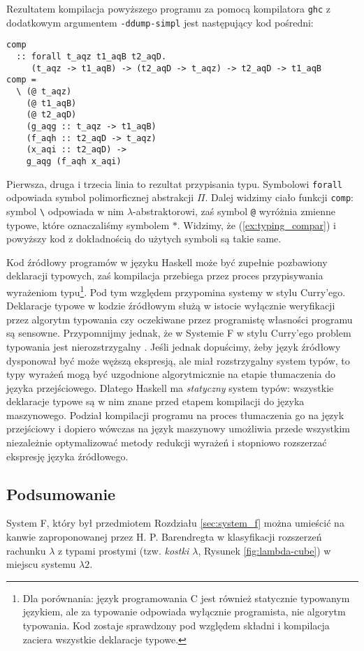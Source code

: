 Rezultatem kompilacja powyższego programu za pomocą kompilatora \texttt{ghc} z dodatkowym argumentem \texttt{-ddump-simpl} jest następujący kod pośredni:

\begin{verbatim}
comp
  :: forall t_aqz t1_aqB t2_aqD.
     (t_aqz -> t1_aqB) -> (t2_aqD -> t_aqz) -> t2_aqD -> t1_aqB
comp =
  \ (@ t_aqz)
    (@ t1_aqB)
    (@ t2_aqD)
    (g_aqg :: t_aqz -> t1_aqB)
    (f_aqh :: t2_aqD -> t_aqz)
    (x_aqi :: t2_aqD) ->
    g_aqg (f_aqh x_aqi)
\end{verbatim}

Pierwsza, druga i trzecia linia to rezultat przypisania typu. Symbolowi \texttt{forall} odpowiada symbol polimorficznej abstrakcji \(\Pi\). Dalej widzimy ciało funkcji \texttt{comp}: symbol \texttt{\textbackslash} odpowiada w nim \(\lambda\)-abstraktorowi, zaś symbol \texttt{@} wyróżnia zmienne typowe, które oznaczaliśmy symbolem \(\ast\). Widzimy, że (\ref{ex:typing_compar}) i powyższy kod z dokładnością do użytych symboli są takie same.

Kod źródłowy programów w języku Haskell może być zupełnie pozbawiony deklaracji typowych, zaś kompilacja przebiega przez proces przypisywania wyrażeniom typu\footnote{Dla porównania: język programowania C jest również statycznie typowanym językiem, ale za typowanie odpowiada wyłącznie programista, nie algorytm typowania. Kod zostaje sprawdzony pod względem składni i kompilacja zaciera wszystkie deklaracje typowe.}. Pod tym względem przypomina systemy w stylu Curry'ego. Deklaracje typowe w kodzie źródłowym służą w istocie wyłącznie weryfikacji przez algorytm typowania czy oczekiwane przez programistę własności programu są sensowne. Przypomnijmy jednak, że w Systemie F w stylu Curry'ego problem typowania jest nierozstrzygalny \cite{Wells_98}. Jeśli jednak dopuścimy, żeby język źródłowy dysponował być może węższą ekspresją, ale miał rozstrzygalny system typów, to typy wyrażeń mogą być uzgodnione algorytmicznie na etapie tłumaczenia do języka przejściowego. Dlatego Haskell ma \emph{statyczny} system typów: wszystkie deklaracje typowe są w nim znane przed etapem kompilacji do języka maszynowego. Podział kompilacji programu na proces tłumaczenia go na język przejściowy i dopiero wówczas na język maszynowy umożliwia przede wszystkim niezależnie optymalizować metody redukcji wyrażeń i stopniowo rozszerzać ekspresję języka źródłowego.

\subsection{Podsumowanie}
System F, który był przedmiotem Rozdziału \ref{sec:system_f} można umieścić na kanwie zaproponowanej przez H. P. Barendregta w \cite[Rozdział 5]{Barendregt_1992} klasyfikacji rozszerzeń rachunku \(\lambda\) z typami prostymi (tzw. \emph{kostki \(\lambda\)}, Rysunek \ref{fig:lambda-cube}) w miejscu systemu \(\lambda 2\). 

